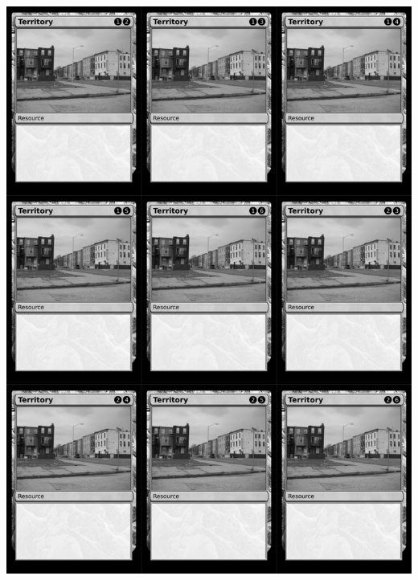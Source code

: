 \documentclass[a4paper]{article}
\begin{document}
\newpage

\begin{center}
	\centering
	\includegraphics[width=200.5mm,height=280.7mm]{output/temp/page24.png}
\end{center}
\end{document}
